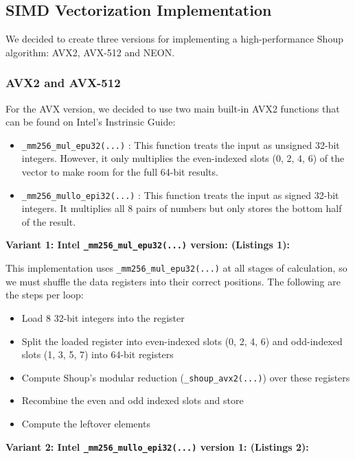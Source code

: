 \documentclass{article}
\newcommand{\pointlabel}[1]{\par\smallskip\noindent\textbf{\textcolor{accentorange}{#1:}} }
\begin{document}
\subsection{SIMD Vectorization Implementation}
We decided to create three versions for implementing a high-performance Shoup algorithm: AVX2, AVX-512 and NEON.

\subsubsection{AVX2 and AVX-512}
For the AVX version, we decided to use two main built-in AVX2 functions that can be found on Intel's Instrinsic Guide: \cite{intel_instrinsics}
\begin{itemize}
    \item \texttt{\_mm256\_mul\_epu32(...)} : This function treats the input as unsigned 32-bit integers. However, it only multiplies the
    even-indexed slots (0, 2, 4, 6) of the vector to make room for the full 64-bit results.
    \item \texttt{\_mm256\_mullo\_epi32(...)} : This function treats the input as signed 32-bit integers. It multiplies all 8 pairs of numbers but only stores the bottom half of the result.
\end{itemize}


\pointlabel{Variant 1: Intel \texttt{\_mm256\_mul\_epu32(...)} version: (Listings 1)}

This implementation uses \texttt{\_mm256\_mul\_epu32(...)} at all stages of calculation, so we must shuffle the data registers into their correct positions. The following are the steps per loop:

\begin{itemize}
    \item Load 8 32-bit integers into the register
    \item Split the loaded register into even-indexed slots (0, 2, 4, 6) and odd-indexed slots (1, 3, 5, 7) into 64-bit registers
    \item Compute Shoup's modular reduction (\texttt{\_shoup\_avx2(...)}) over these registers
    \item Recombine the even and odd indexed slots and store
    \item Compute the leftover elements
\end{itemize}

\pointlabel{Variant 2: Intel \texttt{\_mm256\_mullo\_epi32(...)} version 1: (Listings 2)} 
\end{document}
